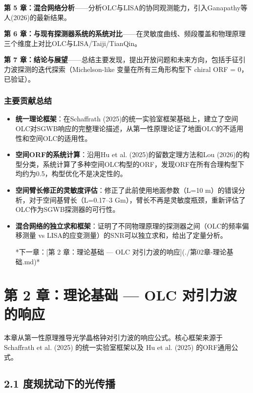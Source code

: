 \documentclass[12pt,a4paper]{article}
\begin{document}
\textbf{第 5 章：混合网络分析}——分析OLC与LISA的协同观测能力，引入Ganapathy等人(2026)的最新结果。

\textbf{第 6 章：与现有探测器系统的系统对比}——在灵敏度曲线、频段覆盖和物理原理三个维度上对比OLC与LISA/Taiji/TianQin。

\textbf{第 7 章：结论与展望}——总结主要发现，提出开放问题和未来方向，包括手征引力波探测的迭代探索（Michelson-like 变量在所有三角形构型下 chiral ORF = 0，已验证）。

\subsubsection{主要贡献总结}


\begin{itemize}
  \item[1] \textbf{统一理论框架}：在Schaffrath (2025)的统一实验室框架基础上，建立了空间OLC对SGWB响应的完整理论描述，从第一性原理论证了地面OLC的不适用性和空间OLC的适用性。

  \item[2] \textbf{空间ORF的系统计算}：沿用Hu et al. (2025)的留数定理方法和Lou (2026)的构型分类，系统计算了多种空间OLC构型的ORF，发现ORF在所有合理构型下均约为0.5，构型优化不是决定性的。

  \item[3] \textbf{空间臂长修正的灵敏度评估}：修正了此前使用地面参数（L=10 m）的错误分析，对于空间基臂长（L=0.17–3 Gm），臂长不再是灵敏度瓶颈，重新评估了OLC作为SGWB探测器的可行性。

  \item[4] \textbf{混合网络的独立求和框架}：证明了不同物理原理的探测器之间（OLC的频率偏移测量 vs LISA的应变测量）的SNR可以独立求和，给出了定量分析。


*下一章：[第 2 章：理论基础 — OLC 对引力波的响应](./第02章-理论基础.md)*
\end{itemize}
\section{第 2 章：理论基础 — OLC 对引力波的响应}


本章从第一性原理推导光学晶格钟对引力波的响应公式。核心框架来源于 Schaffrath et al. (2025) 的统一实验室框架\cite{ref7}以及 Hu et al. (2025) 的ORF通用公式\cite{ref9}。

\subsection{2.1 度规扰动下的光传播}
\end{document}
